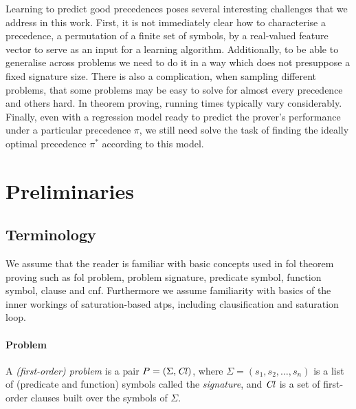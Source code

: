Learning to predict good precedences poses several interesting challenges that we address in this work.
First, it is not immediately clear how to characterise a precedence, a permutation of a finite set of symbols,
by a real-valued feature vector to serve as an input for a learning algorithm. 
Additionally, to be able to generalise across problems
we need to do it in a way which does not presuppose a fixed signature size. 
There is also a complication, when sampling different problems,
that some problems may be easy to solve for almost every precedence and others hard.
In theorem proving, running times typically vary considerably.
Finally, even with a regression model ready to predict the prover's performance 
under a particular precedence $\pi$, we still need solve the task of finding 
the ideally optimal precedence $\pi^*$ according to this model.


\newpage

\section{Preliminaries}

\subsection{Terminology}

We assume that the reader is familiar with basic concepts used in \gls{fol} theorem proving
such as \gls{fol} problem, problem signature, predicate symbol, function symbol, clause and \gls{cnf}.
Furthermore we assume familiarity with basics of the inner workings of saturation-based \glspl{atp},
including clausification and saturation loop.


\paragraph{Problem}
A \emph{(first-order) problem} is a pair \(P = (\Sigma, \operatorname{\mathit{Cl}})\),
where \(\Sigma = (s_1, s_2, \ldots, s_n)\) is a list of (predicate and function) symbols called the \emph{signature},
and \(\operatorname{\mathit{Cl}}\) is a set of first-order
clauses built over the symbols of \(\Sigma\).


